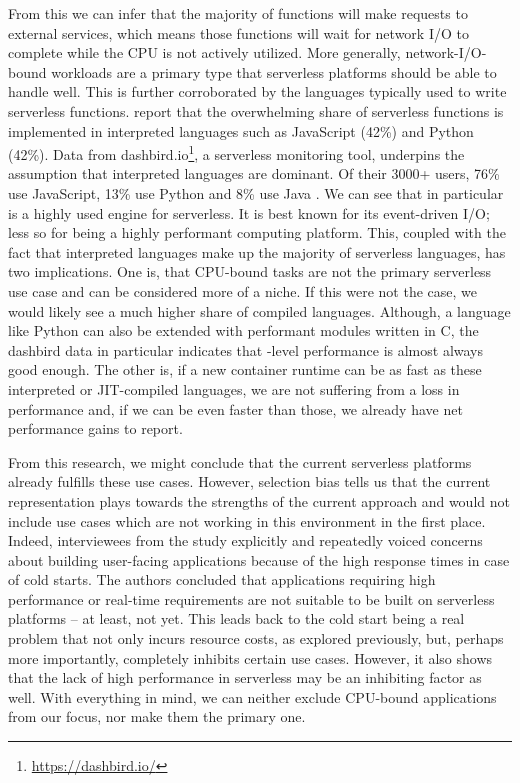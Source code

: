 From this we can infer that the majority of functions will make requests to external services, which means those functions will wait for network I/O to complete while the CPU is not actively utilized. More generally, network-I/O-bound workloads are a primary type that serverless platforms should be able to handle well. This is further corroborated by the languages typically used to write serverless functions. \citeauthor{Eismann2021} report that the overwhelming share of serverless functions is implemented in interpreted languages such as JavaScript (42\%) and Python (42\%). Data from dashbird.io\footnote{\url{https://dashbird.io/}}, a serverless monitoring tool, underpins the assumption that interpreted languages are dominant. Of their 3000+ users, 76\% use JavaScript, 13\% use Python and 8\% use Java \cite{Rehemaegi2019}. We can see that  in particular is a highly used engine for serverless. It is best known for its event-driven I/O; less so for being a highly performant computing platform. This, coupled with the fact that interpreted languages make up the majority of serverless languages, has two implications.
One is, that CPU-bound tasks are not the primary serverless use case and can be considered more of a niche. If this were not the case, we would likely see a much higher share of compiled languages. Although, a language like Python can also be extended with performant modules written in C, the dashbird data in particular indicates that -level performance is almost always good enough.
The other is, if a new container runtime can be as fast as these interpreted or JIT-compiled languages, we are not suffering from a loss in performance and, if we can be even faster than those, we already have net performance gains to report.

From this research, we might conclude that the current serverless platforms already fulfills these use cases. However, selection bias tells us that the current representation plays towards the strengths of the current approach and would not include use cases which are not working in this environment in the first place.
Indeed, interviewees from the \citeauthor{Leitner2019} study explicitly and repeatedly voiced concerns about building user-facing applications because of the high response times in case of cold starts. The authors concluded that applications requiring high performance or real-time requirements are not suitable to be built on serverless platforms -- at least, not yet. This leads back to the cold start being a real problem that not only incurs resource costs, as explored previously, but, perhaps more importantly, completely inhibits certain use cases.
However, it also shows that the lack of high performance in serverless may be an inhibiting factor as well. With everything in mind, we can neither exclude CPU-bound applications from our focus, nor make them the primary one.

